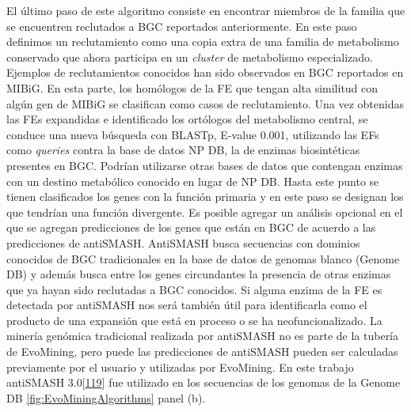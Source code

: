 \documentclass[12pt,twoside]{reedthesis}
\begin{document}
  El último paso de este algoritmo consiste en encontrar miembros de la
  familia que se encuentren reclutados a BGC reportados anteriormente. En
  este paso definimos un reclutamiento como una copia extra de una familia
  de metabolismo conservado que ahora participa en un \emph{cluster} de
  metabolismo especializado. Ejemplos de reclutamientos conocidos han sido
  observados en BGC reportados en MIBiG. En esta parte, los homólogos de
  la FE que tengan alta similitud con algún gen de MIBiG se clasifican
  como casos de reclutamiento. Una vez obtenidas las FEs expandidas e
  identificado los ortólogos del metabolismo central, se conduce una nueva
  búsqueda con BLASTp, E-value 0.001, utilizando las EFs como
  \emph{queries} contra la base de datos NP DB, la de enzimas
  biosintéticas presentes en BGC. Podrían utilizarse otras bases de datos
  que contengan enzimas con un destino metabólico conocido en lugar de NP
  DB. Hasta este punto se tienen clasificados los genes con la función
  primaria y en este paso se designan los que tendrían una función
  divergente. Es posible agregar un análisis opcional en el que se agregan
  predicciones de los genes que están en BGC de acuerdo a las predicciones
  de antiSMASH. AntiSMASH busca secuencias con dominios conocidos de BGC
  tradicionales en la base de datos de genomas blanco (Genome DB) y además
  busca entre los genes circundantes la presencia de otras enzimas que ya
  hayan sido reclutadas a BGC conocidos. Si alguna enzima de la FE es
  detectada por antiSMASH nos será también útil para identificarla como el
  producto de una expansión que está en proceso o se ha neofuncionalizado.
  La minería genómica tradicional realizada por antiSMASH no es parte de
  la tubería de EvoMining, pero puede las predicciones de antiSMASH pueden
  ser calculadas previamente por el usuario y utilizadas por EvoMining. En
  este trabajo antiSMASH
  3.0{[}\protect\hyperlink{ref-weber_antismash3_2015}{119}{]} fue
  utilizado en los secuencias de los genomas de la Genome DB
  \autoref{fig:EvoMiningAlgorithms} panel (b).
  
\end{document}
